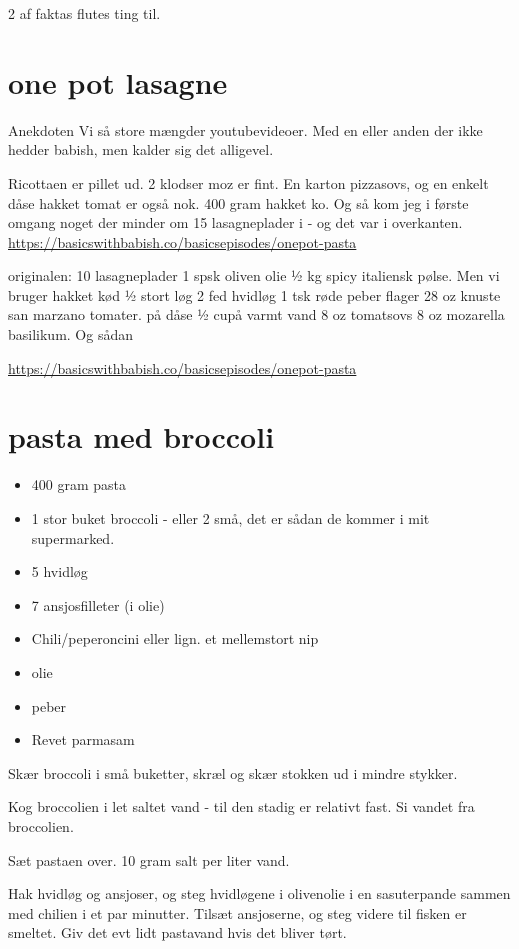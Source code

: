 \documentclass[
]{book}
\providecommand{\tightlist}{%
  \setlength{\itemsep}{0pt}\setlength{\parskip}{0pt}}
\begin{document}
2 af faktas flutes ting til.

\section{one pot lasagne}\label{one-pot-lasagne}

Anekdoten
Vi så store mængder youtubevideoer. Med en eller anden der ikke hedder babish, men kalder sig det alligevel.

Ricottaen er pillet ud. 2 klodser moz er fint. En karton pizzasovs, og en enkelt dåse hakket tomat er også nok.
400 gram hakket ko.
Og så kom jeg i første omgang noget der minder om 15 lasagneplader i - og det var i overkanten.
\url{https://basicswithbabish.co/basicsepisodes/onepot-pasta}

originalen:
10 lasagneplader
1 spsk oliven olie
½ kg spicy italiensk pølse. Men vi bruger hakket kød
½ stort løg
2 fed hvidløg
1 tsk røde peber flager
28 oz knuste san marzano tomater. på dåse
½ cupå varmt vand
8 oz tomatsovs
8 oz mozarella
basilikum. Og sådan

\url{https://basicswithbabish.co/basicsepisodes/onepot-pasta}

\section{pasta med broccoli}\label{pasta-med-broccoli}

\begin{itemize}
\tightlist
\item
  400 gram pasta
\item
  1 stor buket broccoli - eller 2 små, det er sådan de kommer i mit supermarked.
\item
  5 hvidløg
\item
  7 ansjosfilleter (i olie)
\item
  Chili/peperoncini eller lign. et mellemstort nip
\item
  olie
\item
  peber
\item
  Revet parmasam
\end{itemize}

Skær broccoli i små buketter, skræl og skær stokken ud i mindre stykker.

Kog broccolien i let saltet vand - til den stadig er relativt fast. Si vandet fra broccolien.

Sæt pastaen over. 10 gram salt per liter vand.

Hak hvidløg og ansjoser, og steg hvidløgene i olivenolie i en sasuterpande sammen med chilien i et par minutter. Tilsæt ansjoserne, og steg videre til fisken er smeltet. Giv det evt lidt pastavand hvis det bliver tørt.
\end{document}
